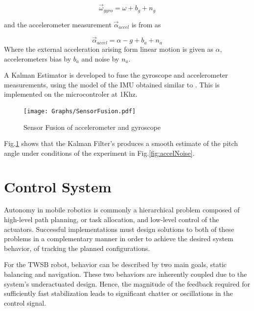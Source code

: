         \begin{equation}
            \vec\omega_{gyro} = \omega + b_g + n_g
        \end{equation}

        and the accelerometer measurement \ensuremath{\vec{\alpha}_{accel}} is from as 
        
        \begin{equation}
            \vec{\alpha}_{accel} = \alpha - g + b_a + n_a
        \end{equation}
        Where the external acceleration arising form linear motion is given as $\alpha$, accelerometers bias by $b_a$ and noise by $n_a$. 

        A Kalman Estimator is developed to fuse the gyroscope and accelerometer measurements, using the model of the IMU obtained similar to \cite{ComplimentaryKalman}.
        This is implemented on the microcontroler at 1Khz.  

        \begin{figure}[H]
            \centering
            \texttt{[image: Graphs/SensorFusion.pdf]}
            \caption{Sensor Fusion of accelerometer and gyroscope}
            \label{fig:SensorFusion}
        \end{figure}
             
        Fig.\ref{fig:SensorFusion} shows that the Kalman Filter's produces a smooth estimate of the pitch angle
        under conditions of the experiment in Fig.\ref{fig:accelNoise}. 
        \pagebreak{}

    \section{Control System}
        Autonomy in mobile robotics is commonly a hierarchical problem composed of high-level path planning, 
        or task allocation, and low-level control of the actuators.  
        Successful implementations must design solutions to both of these problems in a complementary manner in order 
        to achieve the desired system behavior, of tracking the planned configurations.
                
        For the TWSB robot, behavior can be described by two main goals, static balancing and navigation.
        These two behaviors are inherently coupled due to the system's underactuated design. Hence, the 
        magnitude of the feedback required for sufficiently fast stabilization leads to significant chatter or oscillations 
        in the control signal.
    
